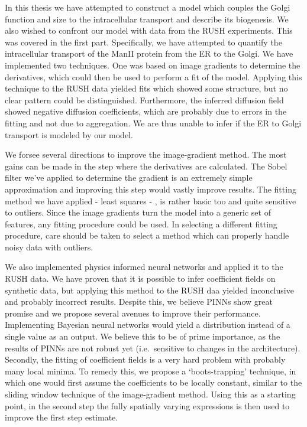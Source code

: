 \documentclass{Dissertate}
\begin{document}
In this thesis we have attempted to construct a model which couples the
Golgi function and size to the intracellular transport and describe its
biogenesis. We also wished to confront our model with data from the RUSH
experiments. This was covered in the first part. Specifically, we have
attempted to quantify the intracellular transport of the ManII protein
from the ER to the Golgi. We have implemented two techniques. One was
based on image gradients to determine the derivatives, which could then
be used to perform a fit of the model. Applying this technique to the
RUSH data yielded fits which showed some structure, but no clear pattern
could be distinguished. Furthermore, the inferred diffusion field showed
negative diffusion coefficients, which are probably due to errors in the
fitting and not due to aggregation. We are thus unable to infer if the
ER to Golgi transport is modeled by our model.

We forsee several directions to improve the image-gradient method. The
most gains can be made in the step where the derivatives are calculated.
The Sobel filter we've applied to determine the gradient is an extremely
simple approximation and improving this step would vastly improve
results. The fitting method we have applied - least squares - , is
rather basic too and quite sensitive to outliers. Since the image
gradients turn the model into a generic set of features, any fitting
procedure could be used. In selecting a different fitting procedure,
care should be taken to select a method which can properly handle noisy
data with outliers.

We also implemented physics informed neural networks and applied it to
the RUSH data. We have proven that it is possible to infer coefficient
fields on synthetic data, but applying this method to the RUSH daa
yielded inconclusive and probably incorrect results. Despite this, we
believe PINNs show great promise and we propose several avenues to
improve their performance. Implementing Bayesian neural networks would
yield a distribution instead of a single value as an output. We believe
this to be of prime importance, as the results of PINNs are not robust
yet (i.e.~sensitive to changes in the architecture). Secondly, the
fitting of coefficient fields is a very hard problem with probably many
local minima. To remedy this, we propose a `boots-trapping' technique,
in which one would first assume the coefficients to be locally constant,
similar to the sliding window technique of the image-gradient method.
Using this as a starting point, in the second step the fully spatially
varying expressions is then used to improve the first step estimate.
\end{document}
